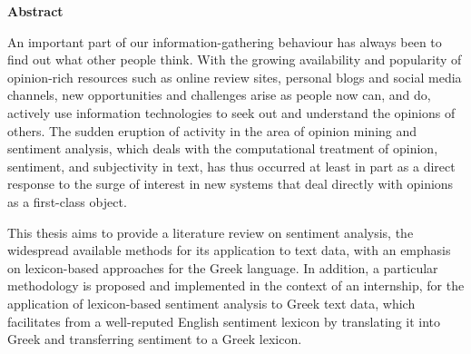 \begin{center}
\textbf{\large Abstract}
\end{center}

An important part of our information-gathering behaviour has always been
to find out what other people think.
With the growing availability and popularity of opinion-rich resources
such as online review sites, personal blogs and social media channels,
new opportunities and challenges arise
as people now can, and do, actively use information technologies
to seek out and understand the opinions of others.
The sudden eruption of activity
in the area of opinion mining and sentiment analysis,
which deals with the computational treatment of opinion,
sentiment, and subjectivity in text,
has thus occurred at least in part
as a direct response to the surge of interest in new systems
that deal directly with opinions as a first-class object.

This thesis aims to provide a literature review on sentiment analysis,
the widespread available methods for its application to text data,
with an emphasis on lexicon-based approaches for the Greek language.
In addition, a particular methodology is proposed and implemented
in the context of an internship,
for the application of lexicon-based sentiment analysis to Greek text data,
which facilitates from a well-reputed English sentiment lexicon
by translating it into Greek and transferring sentiment to a Greek lexicon.

